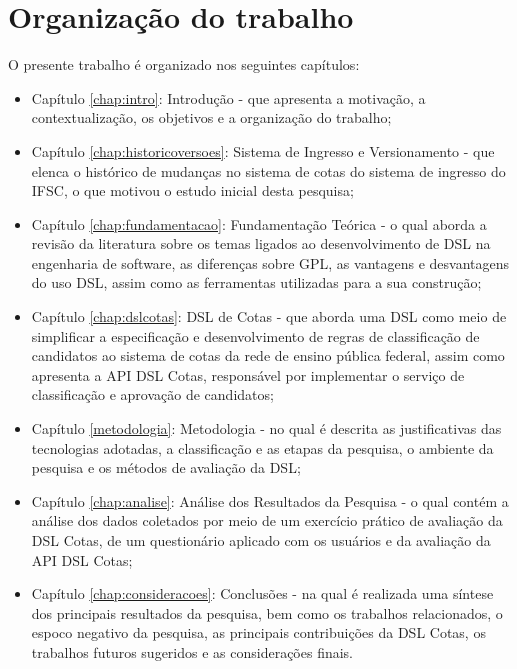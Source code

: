 \section{Organização do trabalho}
\label{organizacao}

O presente trabalho é organizado nos seguintes capítulos:

\begin{itemize}
    \item Capítulo \ref{chap:intro}: Introdução - que apresenta a motivação, a contextualização, os objetivos e a organização do trabalho;
    \item Capítulo \ref{chap:historicoversoes}: Sistema de Ingresso e Versionamento - que elenca o histórico de mudanças no sistema de cotas do sistema de ingresso do \gls{IFSC}, o que motivou o estudo inicial desta pesquisa;
    
    \item Capítulo \ref{chap:fundamentacao}: Fundamentação Teórica - o qual aborda a revisão da literatura sobre os temas ligados ao desenvolvimento de \gls{DSL} na engenharia de software, as diferenças sobre \gls{GPL}, as vantagens e desvantagens do uso  \gls{DSL}, assim como as ferramentas utilizadas para a sua construção;
    
    \item Capítulo \ref{chap:dslcotas}: DSL de Cotas - que aborda uma \gls{DSL} como meio de simplificar a especificação e desenvolvimento de regras de classificação de candidatos ao sistema de cotas da rede de ensino pública federal, assim como apresenta a \gls{API} DSL Cotas, responsável por implementar o serviço de classificação e aprovação de candidatos;
    
   
    \item Capítulo \ref{metodologia}: Metodologia - no qual é descrita as justificativas das tecnologias adotadas, a classificação e as etapas da pesquisa, o ambiente da pesquisa e os métodos de avaliação da DSL;

    \item Capítulo \ref{chap:analise}: Análise dos Resultados da Pesquisa - o qual contém a análise dos dados coletados por meio de um exercício prático de avaliação da DSL Cotas, de um questionário aplicado com os usuários e da avaliação da
    \gls{API} DSL Cotas;
    
    \item Capítulo \ref{chap:consideracoes}: Conclusões - na qual é realizada uma síntese dos principais resultados da pesquisa, bem como os trabalhos relacionados, o espoco negativo da pesquisa, as principais contribuições da DSL Cotas, os trabalhos futuros sugeridos e as considerações finais.
\end{itemize}
